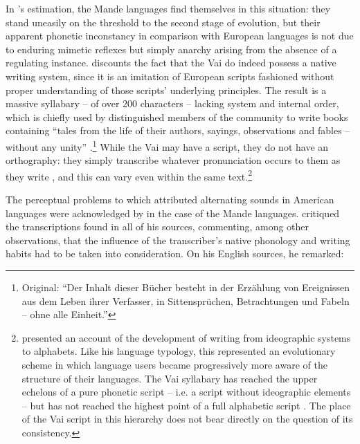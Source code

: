 \documentclass[output=paper]{langscibook}
\begin{document}
In {\Steinthal}'s estimation, the Mande languages find themselves in this situation: they stand uneasily on the threshold to the second stage of evolution, but their apparent phonetic inconstancy in comparison with European languages is not due to enduring mimetic reflexes but simply anarchy arising from the absence of a regulating instance. \citet[257--266]{Steinthal1867} discounts the fact that the Vai do indeed possess a native writing system, since it is an imitation of European scripts fashioned without proper understanding of those scripts' underlying principles. The result is a massive syllabary -- of over 200 characters -- lacking system and internal order, which is chiefly used by distinguished members of the community to write books containing ``tales from the life of their authors, sayings, observations and fables -- without any unity'' \citep[260]{Steinthal1867}.\footnote{Original: ``Der Inhalt dieser Bücher besteht in der Erzählung von Ereignissen aus dem Leben ihrer Verfasser, in Sittensprüchen, Betrachtungen und Fabeln -- ohne alle Einheit.''} While the Vai may have a script, they do not have an orthography: they simply transcribe whatever pronunciation occurs to them as they write \citep[264--266]{Steinthal1867}, and this can vary even within the same text.\footnote{\citet{Steinthal1852} presented an account of the development of writing from ideographic systems to alphabets. Like his language typology, this represented an evolutionary scheme in which language users became progressively more aware of the structure of their languages. The Vai syllabary has reached the upper echelons of a pure phonetic script -- i.e. a script without ideographic elements -- but has not reached the highest point of a full alphabetic script \citep[262--264]{Steinthal1867}. The place of the Vai script in this hierarchy does not bear directly on the question of its consistency.}

The perceptual problems to which \citet{Boas1889} attributed alternating sounds in American languages were acknowledged by {\Steinthal} in the case of the Mande languages. \citet{Steinthal1867} critiqued the transcriptions found in all of his sources, commenting, among other observations, that the influence of the transcriber's native phonology and writing habits had to be taken into consideration. On his English sources, he remarked:
\end{document}
